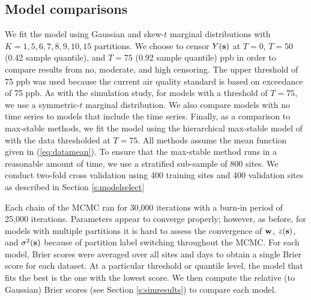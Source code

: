 \documentclass[useAMS,usenatbib,referee]{biom}
\begin{document}

\subsection{Model comparisons}
We fit the model using Gaussian and skew-$t$ marginal distributions with $K=1, 5, 6, 7, 8, 9, 10, 15$ partitions.
We choose to censor $Y(\mbox{\bf s})$ at $T = 0$, $T = 50$ (0.42 sample quantile), and $T = 75$ (0.92 sample quantile) ppb in order to compare results from no, moderate, and high censoring.
The upper threshold of 75 ppb was used because the current air quality standard is based on exceedance of 75 ppb.
As with the simulation study, for models with a threshold of $T = 75$, we use a symmetric-$t$ marginal distribution.
We also compare models with no time series to models that include the time series.
Finally, as a comparison to max-stable methods, we fit the model using the hierarchical max-stable model of \citet{Reich2012} with the data thresholded at $T = 75$.
All methods assume the mean function given in (\ref{eq:datamean}).
To ensure that the max-stable method runs in a reasonable amount of time, we use a stratified sub-sample of 800 sites.
We conduct two-fold cross validation using 400 training sites and 400 validation sites as described in Section \ref{s:modelselect}

Each chain of the MCMC ran for 30,000 iterations with a burn-in period of 25,000 iterations.
Parameters appear to converge properly; however, as before, for models with multiple partitions it is hard to assess the convergence of $\mbox{\bf w}$, $z(\mbox{\bf s})$, and $\sigma^2(\mbox{\bf s})$ because of partition label switching throughout the MCMC.
For each model, Brier scores were averaged over all sites and days to obtain a single Brier score for each dataset.
At a particular threshold or quantile level, the model that fits the best is the one with the lowest score.
We then compute the relative (to Gaussian) Brier scores (see Section \ref{s:simresults}) to compare each model.
\end{document}
